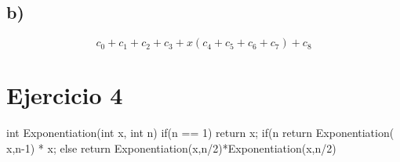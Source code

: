 \documentclass[10pt,a4paper]{article}
\begin{document}
        \subsection{b)}
            $$ c_{0} + c_{1} + c_{2} + c_{3} +  x ( c_{4} + c_{5} + c_{6} +c_{7}) + c_{8} $$
            
    \section{Ejercicio 4}
        \code
        int Exponentiation(int x, int n)
        {
            if(n == 1) 
                return x;
            if(n %
                return Exponentiation( x,n-1) * x;
            else 
                return Exponentiation(x,n/2)*Exponentiation(x,n/2)  
        }
        
\end{document}
